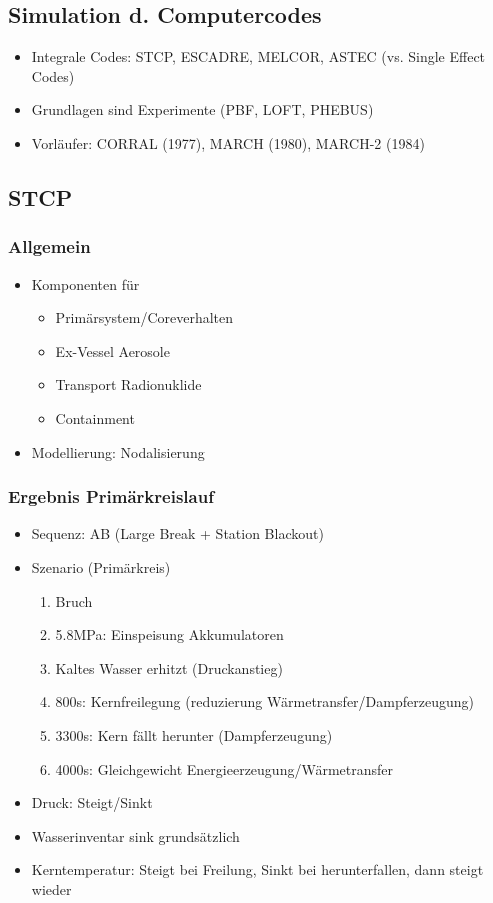 \documentclass[12pt]{article}
\begin{document}
\subsection{Simulation d. Computercodes}
\begin{itemize}[noitemsep]
	\item Integrale Codes: STCP, ESCADRE, MELCOR, ASTEC (vs. Single Effect Codes)
	\item Grundlagen sind Experimente (PBF, LOFT, PHEBUS)
	\item Vorläufer: CORRAL (1977), MARCH (1980), MARCH-2 (1984)
\end{itemize}

\subsection{STCP}

\subsubsection{Allgemein}
\begin{itemize}[noitemsep]
	\item Komponenten für
		\begin{itemize}[noitemsep]
			\item Primärsystem/Coreverhalten
			\item Ex-Vessel Aerosole
			\item Transport Radionuklide
			\item Containment
		\end{itemize}
	\item Modellierung: Nodalisierung
\end{itemize}

\subsubsection{Ergebnis Primärkreislauf}
\begin{itemize}[noitemsep]
	\item Sequenz: AB (Large Break + Station Blackout)
	\item Szenario (Primärkreis)
		\begin{enumerate}
			\item Bruch
			\item 5.8MPa: Einspeisung Akkumulatoren
			\item Kaltes Wasser erhitzt (Druckanstieg)
			\item 800s: Kernfreilegung (reduzierung Wärmetransfer/Dampferzeugung)
			\item 3300s: Kern fällt herunter (Dampferzeugung)
			\item 4000s: Gleichgewicht Energieerzeugung/Wärmetransfer
		\end{enumerate}
	\item Druck: Steigt/Sinkt
	\item Wasserinventar sink grundsätzlich
	\item Kerntemperatur: Steigt bei Freilung, Sinkt bei herunterfallen, dann steigt wieder
\end{itemize}
\end{document}
